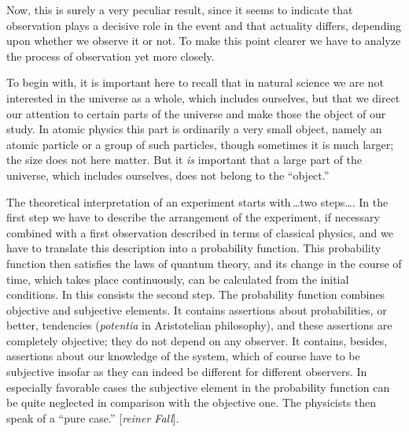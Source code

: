 Now, this is surely a very peculiar result, since it seems to indicate
that observation plays a decisive role in the event and that actuality
differs, depending upon whether we observe it or not. To make this point
clearer we have to analyze the process of observation yet more closely.

To begin with, it is important here to recall that in natural science we
are not interested in the universe as a whole, which includes ourselves,
but that we direct our attention to certain parts of the universe and
make those the object of our study. In atomic physics this part is
ordinarily a very small object, namely an atomic particle or a group of
such particles, though sometimes it is much larger; the size does not
here matter. But it \emph{is} important that a large part of the
universe, which includes ourselves, does not belong to the ``object.''

The theoretical interpretation of an experiment starts with\,\ldots two
steps\ldots. In the first step we have to describe the arrangement of
the experiment, if necessary combined with a first observation described
in terms of classical physics, and we have to translate this description
into a probability function. This probability function then satisfies
the laws of quantum theory, and its change in the course of time, which
takes place continuously, can be calculated from the initial conditions.
In this consists the second step. The probability function combines
objective and subjective elements. It contains assertions about
probabilities, or better, tendencies (\emph{potentia} in Aristotelian
philosophy), and these assertions are completely objective; they do not
depend on any observer. It contains, besides, assertions about our
knowledge of the system, which of course have to be subjective insofar
as they can indeed be different for different observers. In especially
favorable cases the subjective element in the probability function can
be quite neglected in comparison with the objective one. The physicists
then speak of a ``pure case.'' {[}\emph{reiner Fall}{]}.

